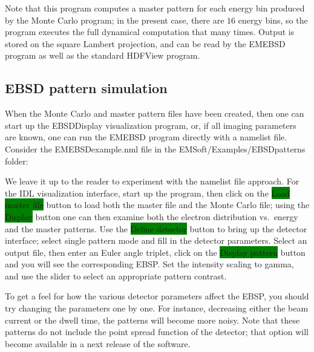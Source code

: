 \documentclass[DIV=calc, paper=letter, fontsize=11pt]{scrartcl}	 %
\newcommand{\button}[1]{\colorbox{green}{\textsf{#1}} button}
\begin{document}
Note that this program computes a master pattern for each energy bin produced by the Monte Carlo program; in the
present case, there are $16$ energy bins, so the program executes the full dynamical computation that many times.
Output is stored on the square Lambert projection, and can be read by the \textsf{EMEBSD} program as well as
the standard HDFView program.

\subsection{EBSD pattern simulation}
When the Monte Carlo and master pattern files have been created, then one can start up the 
\textsf{EBSDDisplay} visualization program, or, if all imaging parameters are known, one can
run the \textsf{EMEBSD} program directly with a namelist file.  Consider 
the EMEBSDexample.nml file in the EMSoft/Examples/EBSDpatterns folder:

We leave it up to the reader to experiment with the namelist file approach.  For the IDL visualization interface, 
start up the program, then click on the \button{Load master file} to load both the master file and the Monte Carlo
file; using the \button{Display} one can then examine both the electron distribution vs.\ energy and the master
patterns.  Use the \button{Define detector} to bring up the detector interface; select \textsf{single pattern} mode
and fill in the detector parameters.  Select an output file, then enter an Euler angle triplet, click on the
\button{Display pattern} and you will see the corresponding EBSP.  Set the intensity scaling to gamma, and 
use the slider to select an appropriate pattern contrast.

To get a feel for how the various detector parameters affect the EBSP, you should try changing the parameters 
one by one.  For instance, decreasing either the beam current or the dwell time, the patterns will become more
noisy.  Note that these patterns do not include the point spread function of the detector; that option will become 
available in a next release of the software.
\end{document}
